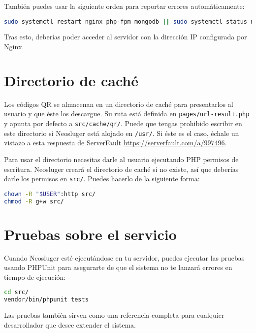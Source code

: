 También puedes usar la siguiente orden para reportar errores automáticamente:

\begin{lstlisting}[language=sh]
sudo systemctl restart nginx php-fpm mongodb || sudo systemctl status nginx
\end{lstlisting}

Tras esto, deberías poder acceder al servidor con la dirección IP configurada por Nginx.

\section{Directorio de caché}\label{directorio-de-cache}

Los códigos QR se almacenan en un directorio de caché para presentarlos al usuario y que éste los descargue.
Su ruta está definida en \texttt{pages/url-result.php} y apunta por defecto a \texttt{src/cache/qr/}.
Puede que tengas prohibido escribir en este directorio si Neosluger está alojado en \texttt{/usr/}.
Si éste es el caso, échale un vistazo a esta respuesta de ServerFault \url{https://serverfault.com/a/997496}.

Para usar el directorio necesitas darle al usuario ejecutando PHP permisos de escritura.
Neosluger creará el directorio de caché si no existe, así que deberías darle los permisos en \texttt{src/}.
Puedes hacerlo de la siguiente forma:

\begin{lstlisting}[language=sh]
chown -R "$USER":http src/
chmod -R g+w src/
\end{lstlisting}

\section{Pruebas sobre el servicio}\label{pruebas-sobre-el-servicio}

Cuando Neosluger esté ejecutándose en tu servidor, puedes ejecutar las pruebas usando PHPUnit para asegurarte de que el sistema no te lanzará errores en tiempo de ejecución:

\begin{lstlisting}[language=sh]
cd src/
vendor/bin/phpunit tests
\end{lstlisting}

Las pruebas también sirven como una referencia completa para cualquier desarrollador que desee extender el sistema.
